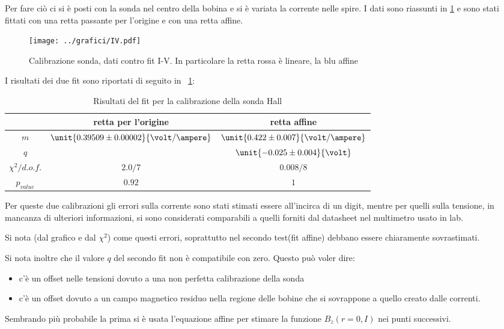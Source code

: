 \documentclass[10pt,a4paper]{article}
\begin{document}
Per fare ciò ci si è posti con la sonda nel centro della bobina e si è variata la corrente nelle spire. I dati sono riassunti in \figurename{\ref{fig:Hallcal}} e sono stati fittati con una retta passante per l'origine e con una retta affine. 

\begin{figure}[H]
	\centering
	\texttt{[image: ../grafici/IV.pdf]}
	\caption{Calibrazione sonda, dati contro fit I-V. In particolare la retta rossa è lineare, la blu affine}
	\label{fig:Hallcal}
\end{figure}

I risultati dei due fit sono riportati di seguito in \tablename{~\ref{tab:Hallcal}}:

\begin{table}[H]
	\centering
	\begin{tabular}{c|c|c}
			& retta per l'origine & retta affine\\
		\hline
		$m$ & $\unit{0.39509 \pm 0.00002}{\volt/\ampere}$ & $\unit{0.422 \pm 0.007}{\volt/\ampere}$ \\
		$q$ & & $\unit{-0.025 \pm 0.004}{\volt}$\\
		$\chi^2/d.o.f.$ & $2.0/7$ & $0.008/8$ \\
		$p_{value}$ & $0.92$ & $1$\\
	\end{tabular}
	\caption{Risultati del fit per la calibrazione della sonda Hall}
	\label{tab:Hallcal}
\end{table}

Per queste due calibrazioni gli errori sulla corrente sono stati stimati essere all'incirca di un digit, mentre per quelli sulla tensione, in mancanza di ulteriori informazioni, si sono considerati comparabili a quelli forniti dal datasheet nel multimetro usato in lab.

Si nota (dal grafico e dal $\chi^2$) come questi errori, soprattutto nel secondo test(fit affine) debbano essere chiaramente sovrastimati.


Si nota inoltre che il valore $q$ del secondo fit non è compatibile con zero. Questo può voler dire:
\begin{itemize}
\item c'è un offset nelle tensioni dovuto a una non perfetta calibrazione della sonda
\item c'è un offset dovuto a un campo magnetico residuo nella regione delle bobine che si sovrappone a quello creato dalle correnti.
\end{itemize}
Sembrando più probabile la prima si è usata l'equazione affine per stimare la funzione $B_z(r=0, I)$ nei punti successivi.
\end{document}
